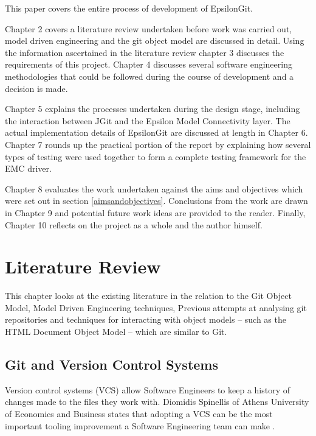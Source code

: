 \documentclass[11pt]{book}
\begin{document}
This paper covers the entire process of development of EpsilonGit.

Chapter 2 covers a literature review undertaken before work was carried out, model driven engineering and the git object model are discussed in detail. Using the information ascertained in the literature review chapter 3 discusses the requirements of this project. Chapter 4 discusses several software engineering methodologies that could be followed during the course of development and a decision is made.

Chapter 5 explains the processes undertaken during the design stage, including the interaction between JGit and the Epsilon Model Connectivity layer. The actual implementation details of EpsilonGit are discussed at length in Chapter 6. Chapter 7 rounds up the practical portion of the report by explaining how several types of testing were used together to form a complete testing framework for the EMC driver.

Chapter 8 evaluates the work undertaken against the aims and objectives which were set out in section \ref{aimsandobjectives}. Conclusions from the work are drawn in Chapter 9 and potential future work ideas are provided to the reader. Finally, Chapter 10 reflects on the project as a whole and the author himself.  

\chapter{Literature Review}
		
\label{litreview}
This chapter looks at the existing literature in the relation to the Git Object Model, Model Driven Engineering techniques, Previous attempts at analysing git repositories and techniques for interacting with object models -- such as the HTML Document Object Model -- which are similar to Git.

\section{Git and Version Control Systems}
\label{sec:git}
Version control systems (VCS) allow Software Engineers to keep a history of changes made to the files they work with. Diomidis Spinellis of Athens University of Economics and Business states that adopting a VCS can be the most important tooling improvement a Software Engineering team can make \cite{toolsofthetrade}.
\end{document}
